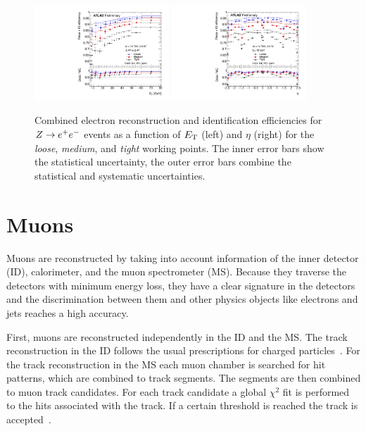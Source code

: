 \begin{figure}[!htb]
    \begin{center}
        \includegraphics[width=0.45\textwidth]{./figures/object_selection/electron_efficiency_et.pdf}
        \includegraphics[width=0.45\textwidth]{./figures/object_selection/electron_efficiency_eta.pdf}
        \caption{Combined electron reconstruction and identification efficiencies for $Z \to e^+e^-$ events as a
                 function of $E_\text{T}$ (left) and $\eta$ (right) for the \emph{loose}, \emph{medium}, and \emph{tight}
                 working points. The inner error bars show the statistical uncertainty, the outer error bars combine
                 the statistical and systematic uncertainties.~\cite{ATLAS-CONF-2016-024}}\label{fig:object_selection:el_id_eff}
    \end{center}
\end{figure}

\section{Muons}\label{sec:object_selection:muons}

Muons are reconstructed by taking into account information of the inner detector (ID), calorimeter, and the
muon spectrometer (MS).
Because  they traverse the detectors with minimum energy loss, they have a clear signature in the detectors and the
discrimination between them and other physics objects like electrons and jets reaches a high accuracy.

First, muons are reconstructed independently in the ID and the MS\@. The track reconstruction in the ID follows the
usual prescriptions for charged particles~\cite{ATL-SOFT-PUB-2007-007,ATLAS-CONF-2010-072}.
For the track reconstruction in the MS each muon chamber is searched for hit patterns, which are combined to track
segments. The segments are then combined to muon track candidates. For each track candidate a global $\chi^2$ fit
is performed to the hits associated with the track. If a certain threshold is reached the track is accepted~\cite{PERF-2015-10}.

